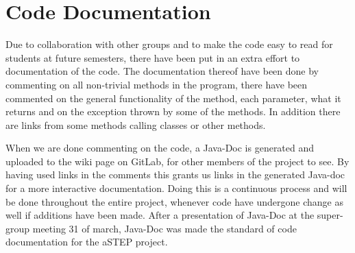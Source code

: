 \section{Code Documentation} \label{sec:code_documentation}
Due to collaboration with other groups and to make the code easy to read for students at future semesters, there have been put in an extra effort to documentation of the code. The documentation thereof have been done by commenting on all non-trivial methods in the program, there have been commented on the general functionality of the method, each parameter, what it returns and on the exception thrown by some of the methods. In addition there are links from some methods calling classes or other methods. 

When we are done commenting on the code, a Java-Doc is generated and uploaded to the wiki page on GitLab, for other members of the project to see. By having used links in the comments this grants us links in the generated Java-doc for a more interactive documentation. 
Doing this is a continuous process and will be done throughout the entire project, whenever code have undergone change as well if additions have been made.
After a presentation of Java-Doc at the super-group meeting 31 of march, Java-Doc was made the standard of code documentation for the aSTEP project.